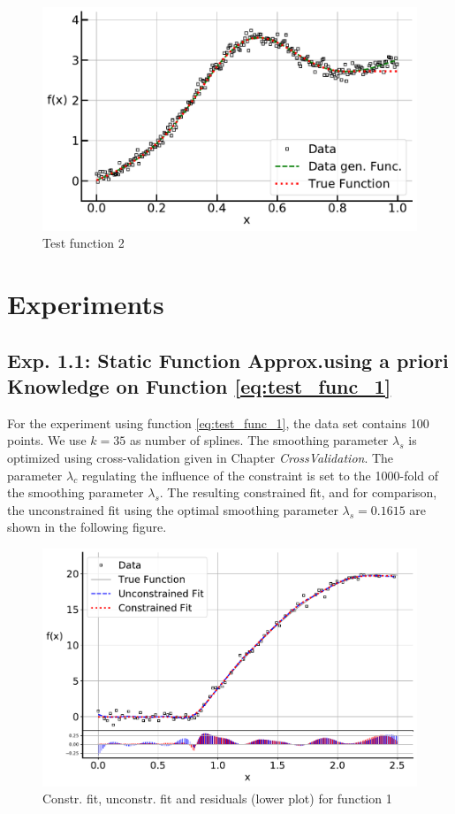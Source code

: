 \documentclass[10pt,a4paper]{article}
\begin{document}
\begin{figure}[H]
	\centering
	\includegraphics[width=\columnwidth]{../thesisplots/exp_peak_data.pdf}
	\caption{Test function 2}
	\label{fig:test_func_2}
\end{figure}

\section{Experiments}

\subsection{Exp. 1.1: Static Function Approx.using a priori Knowledge on Function \ref{eq:test_func_1}}

For the experiment using function \ref{eq:test_func_1}, the data set contains 100 points. We use $k=35$ as number of splines. The smoothing parameter $\lambda_s$ is optimized using cross-validation given in Chapter \emph{CrossValidation}. The parameter $\lambda_c$ regulating the influence of the constraint is set to the 1000-fold of the smoothing parameter $\lambda_s$. The resulting constrained fit, and for comparison, the unconstrained fit using the optimal smoothing parameter $\lambda_s = 0.1615$ are shown in the following figure.

\begin{figure}[H]
	\centering
	\includegraphics[width=\columnwidth]{../thesisplots/exp_inc1_fit.pdf}
	\caption{Constr. fit, unconstr. fit and residuals (lower plot) for function 1}
	\label{fig:test_func_1_fit}
\end{figure}
\end{document}
